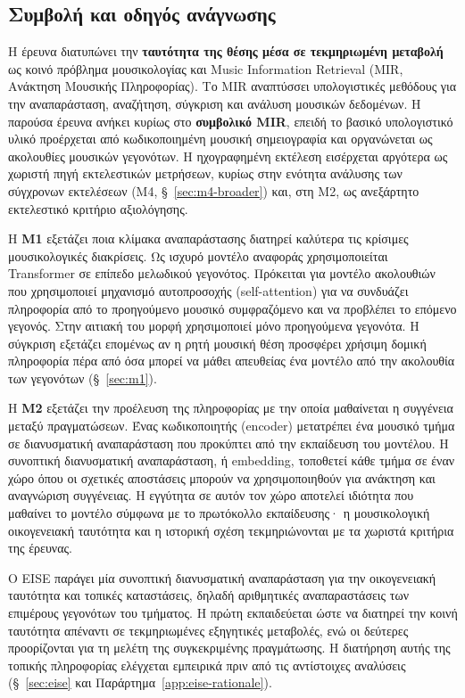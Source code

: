 \documentclass[11pt,a4paper]{article}
\begin{document}
\subsection{Συμβολή και οδηγός ανάγνωσης}

Η έρευνα διατυπώνει την \textbf{ταυτότητα της θέσης μέσα σε τεκμηριωμένη μεταβολή} ως κοινό πρόβλημα μουσικολογίας και Music Information Retrieval (MIR, Ανάκτηση Μουσικής Πληροφορίας). Το MIR αναπτύσσει υπολογιστικές μεθόδους για την αναπαράσταση, αναζήτηση, σύγκριση και ανάλυση μουσικών δεδομένων. Η παρούσα έρευνα ανήκει κυρίως στο \textbf{συμβολικό MIR}, επειδή το βασικό υπολογιστικό υλικό προέρχεται από κωδικοποιημένη μουσική σημειογραφία και οργανώνεται ως ακολουθίες μουσικών γεγονότων. Η ηχογραφημένη εκτέλεση εισέρχεται αργότερα ως χωριστή πηγή εκτελεστικών μετρήσεων, κυρίως στην ενότητα ανάλυσης των σύγχρονων εκτελέσεων (M4, §~\ref{sec:m4-broader}) και, στη M2, ως ανεξάρτητο εκτελεστικό κριτήριο αξιολόγησης.

Η \textbf{M1} εξετάζει ποια κλίμακα αναπαράστασης διατηρεί καλύτερα τις κρίσιμες μουσικολογικές διακρίσεις. Ως ισχυρό μοντέλο αναφοράς χρησιμοποιείται Transformer σε επίπεδο μελωδικού γεγονότος. Πρόκειται για μοντέλο ακολουθιών που χρησιμοποιεί μηχανισμό αυτοπροσοχής (self-attention) για να συνδυάζει πληροφορία από το προηγούμενο μουσικό συμφραζόμενο και να προβλέπει το επόμενο γεγονός. Στην αιτιακή του μορφή χρησιμοποιεί μόνο προηγούμενα γεγονότα. Η σύγκριση εξετάζει επομένως αν η ρητή μουσική θέση προσφέρει χρήσιμη δομική πληροφορία πέρα από όσα μπορεί να μάθει απευθείας ένα μοντέλο από την ακολουθία των γεγονότων (§~\ref{sec:m1}).

Η \textbf{M2} εξετάζει την προέλευση της πληροφορίας με την οποία μαθαίνεται η συγγένεια μεταξύ πραγματώσεων. Ένας κωδικοποιητής (encoder) μετατρέπει ένα μουσικό τμήμα σε διανυσματική αναπαράσταση που προκύπτει από την εκπαίδευση του μοντέλου. Η συνοπτική διανυσματική αναπαράσταση, ή embedding, τοποθετεί κάθε τμήμα σε έναν χώρο όπου οι σχετικές αποστάσεις μπορούν να χρησιμοποιηθούν για ανάκτηση και αναγνώριση συγγένειας. Η εγγύτητα σε αυτόν τον χώρο αποτελεί ιδιότητα που μαθαίνει το μοντέλο σύμφωνα με το πρωτόκολλο εκπαίδευσης· η μουσικολογική οικογενειακή ταυτότητα και η ιστορική σχέση τεκμηριώνονται με τα χωριστά κριτήρια της έρευνας.

Ο EISE παράγει μία συνοπτική διανυσματική αναπαράσταση για την οικογενειακή ταυτότητα και τοπικές καταστάσεις, δηλαδή αριθμητικές αναπαραστάσεις των επιμέρους γεγονότων του τμήματος. Η πρώτη εκπαιδεύεται ώστε να διατηρεί την κοινή ταυτότητα απέναντι σε τεκμηριωμένες εξηγητικές μεταβολές, ενώ οι δεύτερες προορίζονται για τη μελέτη της συγκεκριμένης πραγμάτωσης. Η διατήρηση αυτής της τοπικής πληροφορίας ελέγχεται εμπειρικά πριν από τις αντίστοιχες αναλύσεις (§~\ref{sec:eise} και Παράρτημα~\ref{app:eise-rationale}).
\end{document}
